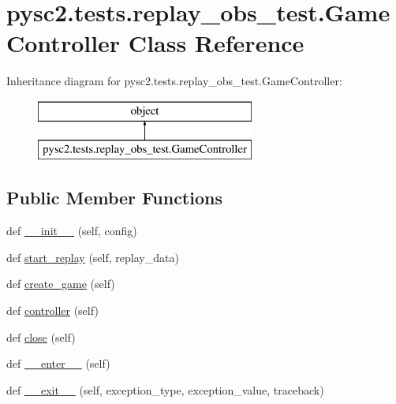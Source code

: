 \hypertarget{classpysc2_1_1tests_1_1replay__obs__test_1_1_game_controller}{}\section{pysc2.\+tests.\+replay\+\_\+obs\+\_\+test.\+Game\+Controller Class Reference}
\label{classpysc2_1_1tests_1_1replay__obs__test_1_1_game_controller}
Inheritance diagram for pysc2.\+tests.\+replay\+\_\+obs\+\_\+test.\+Game\+Controller\+:\begin{figure}[H]
\begin{center}
\leavevmode
\includegraphics[height=2.000000cm]{classpysc2_1_1tests_1_1replay__obs__test_1_1_game_controller}
\end{center}
\end{figure}
\subsection*{Public Member Functions}
\begin{DoxyCompactItemize}
\item 
def \mbox{\hyperlink{classpysc2_1_1tests_1_1replay__obs__test_1_1_game_controller_a0170d78080a4f367923de5bf0c3af971}{\+\_\+\+\_\+init\+\_\+\+\_\+}} (self, config)
\item 
def \mbox{\hyperlink{classpysc2_1_1tests_1_1replay__obs__test_1_1_game_controller_a591d23a08b084f10396ac70e026c28d6}{start\+\_\+replay}} (self, replay\+\_\+data)
\item 
def \mbox{\hyperlink{classpysc2_1_1tests_1_1replay__obs__test_1_1_game_controller_abc04f315338ca168e4842adbb5630edf}{create\+\_\+game}} (self)
\item 
def \mbox{\hyperlink{classpysc2_1_1tests_1_1replay__obs__test_1_1_game_controller_ab27035af6ebc2cb4d6f4ebe2be77a4d0}{controller}} (self)
\item 
def \mbox{\hyperlink{classpysc2_1_1tests_1_1replay__obs__test_1_1_game_controller_a6a992991922f1fac442c416dc270ddd5}{close}} (self)
\item 
def \mbox{\hyperlink{classpysc2_1_1tests_1_1replay__obs__test_1_1_game_controller_a40610f359f2f40a60a058e1b627d0cad}{\+\_\+\+\_\+enter\+\_\+\+\_\+}} (self)
\item 
def \mbox{\hyperlink{classpysc2_1_1tests_1_1replay__obs__test_1_1_game_controller_a9bd1fb5761643766047cea7af01a47f4}{\+\_\+\+\_\+exit\+\_\+\+\_\+}} (self, exception\+\_\+type, exception\+\_\+value, traceback)
\end{DoxyCompactItemize}



